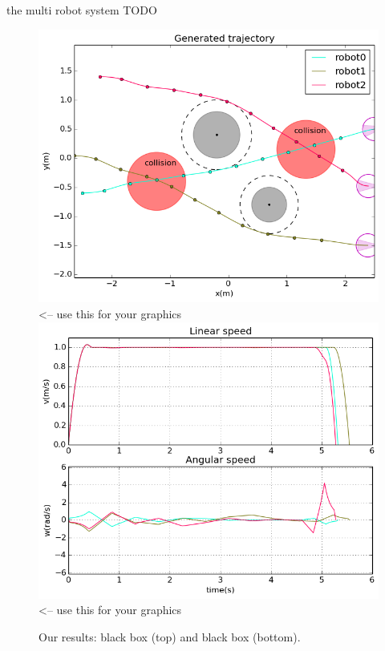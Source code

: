 \documentclass[eprint]{actapoly}
\begin{document}
the multi robot system TODO  \centering

\begin{figure}[!h]\centering
  \includegraphics[width=\linewidth]{./images/collision/multirobot-path.png} %
<-- use this for your graphics
  \\[1mm]
  \includegraphics[width=\linewidth]{./images/collision/multirobot-vw.png} %
<-- use this for your graphics
  \caption{Our results: black box (top) and black box 
(bottom).\label{fig:collision}}
\label{fig:res}
\end{figure}
\end{document}
